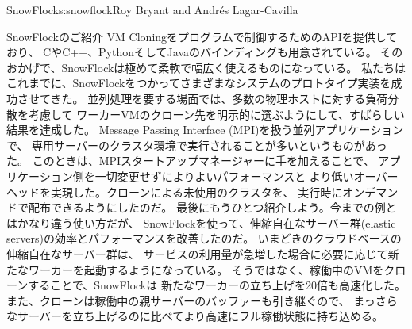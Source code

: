 \begin{aosachapter}{SnowFlock}{s:snowflock}{Roy Bryant and Andr\'e{s} Lagar-Cavilla}
\begin{aosasect1}{SnowFlockのご紹介}
VM Cloningをプログラムで制御するためのAPIを提供しており、
CやC++、PythonそしてJavaのバインディングも用意されている。
そのおかげで、SnowFlockは極めて柔軟で幅広く使えるものになっている。
私たちはこれまでに、SnowFlockをつかってさまざまなシステムのプロトタイプ実装を成功させてきた。
並列処理を要する場面では、多数の物理ホストに対する負荷分散を考慮して
ワーカーVMのクローン先を明示的に選ぶようにして、すばらしい結果を達成した。
Message Passing Interface (MPI)を扱う並列アプリケーションで、
専用サーバーのクラスタ環境で実行されることが多いというものがあった。
このときは、MPIスタートアップマネージャーに手を加えることで、
アプリケーション側を一切変更せずによりよいパフォーマンスと
より低いオーバーヘッドを実現した。クローンによる未使用のクラスタを、
実行時にオンデマンドで配布できるようにしたのだ。
最後にもうひとつ紹介しよう。今までの例とはかなり違う使い方だが、
SnowFlockを使って、伸縮自在なサーバー群(elastic servers)の効率とパフォーマンスを改善したのだ。
いまどきのクラウドベースの伸縮自在なサーバー群は、
サービスの利用量が急増した場合に必要に応じて新たなワーカーを起動するようになっている。
そうではなく、稼働中のVMをクローンすることで、SnowFlockは
新たなワーカーの立ち上げを20倍も高速化した。
また、クローンは稼働中の親サーバーのバッファーも引き継ぐので、
まっさらなサーバーを立ち上げるのに比べてより高速にフル稼働状態に持ち込める。

\end{aosasect1}


\end{aosachapter}
